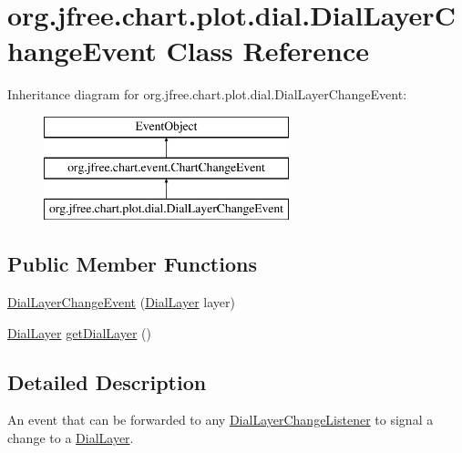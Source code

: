 \hypertarget{classorg_1_1jfree_1_1chart_1_1plot_1_1dial_1_1_dial_layer_change_event}{}\section{org.\+jfree.\+chart.\+plot.\+dial.\+Dial\+Layer\+Change\+Event Class Reference}
\label{classorg_1_1jfree_1_1chart_1_1plot_1_1dial_1_1_dial_layer_change_event}
Inheritance diagram for org.\+jfree.\+chart.\+plot.\+dial.\+Dial\+Layer\+Change\+Event\+:\begin{figure}[H]
\begin{center}
\leavevmode
\includegraphics[height=3.000000cm]{classorg_1_1jfree_1_1chart_1_1plot_1_1dial_1_1_dial_layer_change_event}
\end{center}
\end{figure}
\subsection*{Public Member Functions}
\begin{DoxyCompactItemize}
\item 
\mbox{\hyperlink{classorg_1_1jfree_1_1chart_1_1plot_1_1dial_1_1_dial_layer_change_event_a5a8293e7ec9a89e63c89d6b623340d05}{Dial\+Layer\+Change\+Event}} (\mbox{\hyperlink{interfaceorg_1_1jfree_1_1chart_1_1plot_1_1dial_1_1_dial_layer}{Dial\+Layer}} layer)
\item 
\mbox{\hyperlink{interfaceorg_1_1jfree_1_1chart_1_1plot_1_1dial_1_1_dial_layer}{Dial\+Layer}} \mbox{\hyperlink{classorg_1_1jfree_1_1chart_1_1plot_1_1dial_1_1_dial_layer_change_event_ad84356057e01135304d31929aa131b18}{get\+Dial\+Layer}} ()
\end{DoxyCompactItemize}


\subsection{Detailed Description}
An event that can be forwarded to any \mbox{\hyperlink{interfaceorg_1_1jfree_1_1chart_1_1plot_1_1dial_1_1_dial_layer_change_listener}{Dial\+Layer\+Change\+Listener}} to signal a change to a \mbox{\hyperlink{interfaceorg_1_1jfree_1_1chart_1_1plot_1_1dial_1_1_dial_layer}{Dial\+Layer}}.

